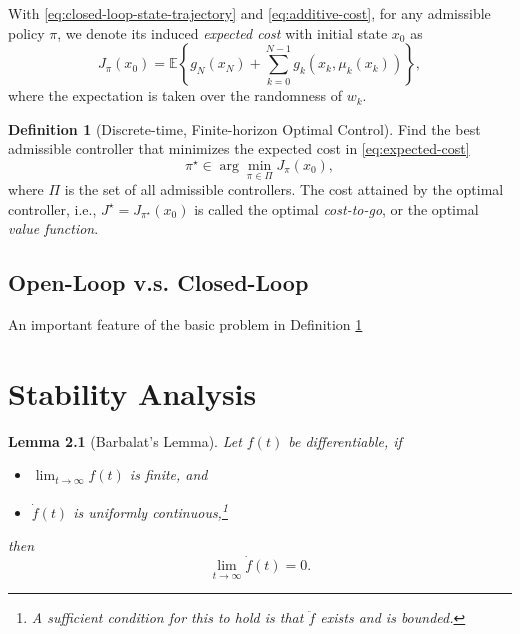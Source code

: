 \documentclass[
]{book}
\newtheorem{lemma}{Lemma}[chapter]
\theoremstyle{definition}
\newtheorem{definition}{Definition}[chapter]
\theoremstyle{definition}
\theoremstyle{definition}
\theoremstyle{definition}
\theoremstyle{remark}
\begin{document}
With \eqref{eq:closed-loop-state-trajectory} and \eqref{eq:additive-cost}, for any admissible policy \(\pi\), we denote its induced \emph{expected cost} with initial state \(x_0\) as
\begin{equation}
J_\pi (x_0) = \mathbb{E} \left\{ g_N(x_N) + \sum_{k=0}^{N-1} g_k (x_k, \mu_k(x_k))  \right\},
\label{eq:expected-cost}
\end{equation}
where the expectation is taken over the randomness of \(w_k\).

\begin{definition}[Discrete-time, Finite-horizon Optimal Control]
\protect\hypertarget{def:basicproblem}{}\label{def:basicproblem}Find the best admissible controller that minimizes the expected cost in \eqref{eq:expected-cost}
\begin{equation}
\pi^\star \in \arg\min_{\pi \in \Pi} J_\pi(x_0),
\end{equation}
where \(\Pi\) is the set of all admissible controllers.
The cost attained by the optimal controller, i.e., \(J^\star = J_{\pi^\star}(x_0)\) is called the optimal \emph{cost-to-go}, or the optimal \emph{value function}.
\end{definition}

\hypertarget{open-loop-v.s.-closed-loop}{%
\section{Open-Loop v.s. Closed-Loop}\label{open-loop-v.s.-closed-loop}}

An important feature of the basic problem in Definition \ref{def:basicproblem}

\hypertarget{stability}{%
\chapter{Stability Analysis}\label{stability}}

\begin{lemma}[Barbalat's Lemma]
\protect\hypertarget{lem:Barbalat}{}\label{lem:Barbalat}Let \(f(t)\) be differentiable, if

\begin{itemize}
\item
  \(\lim_{t \rightarrow \infty} f(t)\) is finite, and
\item
  \(\dot{f}(t)\) is uniformly continuous,\footnote{A sufficient condition for this to hold is that \(\ddot{f}\) exists and is bounded.}
\end{itemize}

then
\[
\lim_{t \rightarrow \infty} \dot{f}(t) = 0.
\]
\end{lemma}
\end{document}
